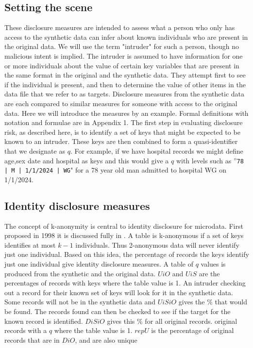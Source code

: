 \documentclass[12pt]{article}
\begin{document}
\subsection{Setting the scene}\label{subsec:scen}
These disclosure measures are intended to assess what a person who only has access 
to the synthetic data can infer about known individuals who are present in the original data.  We will use the term "intruder" for such a person, though no malicious intent is implied. The intruder is assumed to have information for one or more individuals about the value of certain key variables that are present in the same format in the original and the synthetic data. They attempt first to see if the individual is present, and then to determine the value of other items in the data file that we refer to as targets. Disclosure measures from the synthetic data are each compared to similar measures for someone with access to the original data. Here we will introduce the measures by an example. Formal definitions with notation and formulae are in Appendix 1.
The first step in evaluating disclosure risk, as described here, is to identify a set of keys that might be expected to be known to an intruder. These keys are then combined to form a quasi-identifier that we designate as $q$. For example, if we have hospital records we might define age,sex date and hospital as keys and this would give a $q$ with levels such as ''\texttt{78 | M | 1/1/2024 | WG}" for a 78 year old man admitted to hospital WG on 1/1/2024.

\subsection{Identity disclosure measures}\label{subsec:ident} 
The concept of k-anonymity is central to identity disclosure for microdata. First proposed in 1998 \cite{kanon1} it is discussed fully in \cite{elliot_anonframe}. A table is k-anonymous if a set of keys identifies at most $k-1$ individuals. Thus 2-anonymous data will never identify just one individual. Based on this idea, the percentage of records the keys identify just one individual give identity disclosure measures. 
 A table of $q$ values is produced from the synthetic and the original data. $UiO$ and $UiS$ are the percentages of records with keys where the table value is 1. An intruder checking out a record for their known set of keys will look for it in the synthetic data. Some records
will not be in the synthetic data and $UiSiO$  gives the \% that would be found. The records found can then be checked to see if the target for the known record is identified. $DiSiO$ gives this \% for all original records.
original records with a $q$ where the table value is 1. $repU$ is the percentage of original records that are in $DiO$, and are also unique 
\end{document}
